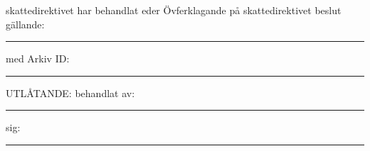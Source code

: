\documentclass{letter}
\begin{document}
skattedirektivet har behandlat eder Övferklagande på skattedirektivet beslut gällande:\\
\vspace*{1cm}
\hrule
med Arkiv ID:
\vspace*{1cm}
\hrule
\Large UTLÅTANDE:
\vfill
\normalsize
behandlat av:
\vspace*{1cm}
\hrule
sig:
\vspace*{1cm}
\hrule
\end{document}
